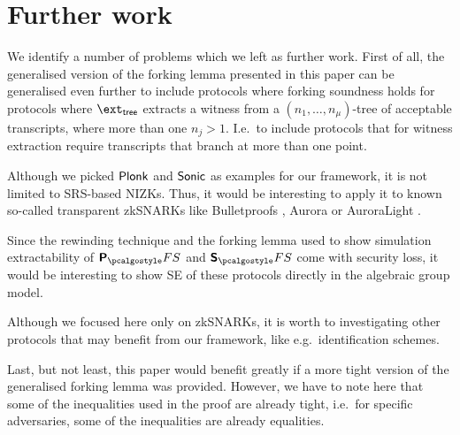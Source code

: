 \documentclass[runningheads,10pt]{llncs}
\begin{document}
\section{Further work}
We identify a number of problems which we left as further work. First of all,
the generalised version of the forking lemma presented in this paper can be
generalised even further to include protocols where forking soundness holds for
protocols where $\extt$ extracts a witness from a $(n_1, \ldots, n_\mu)$-tree of
acceptable transcripts, where more than one $n_j > 1$. I.e.~to include
protocols that for witness extraction require transcripts that branch at more
than one point.

Although we picked $\textnormal{\textsf{Plonk}}$ and ${\textnormal{\textsf{Sonic}}}$ as examples for our framework, it is
not limited to SRS-based NIZKs. Thus, it would be interesting to apply it to
known so-called transparent zkSNARKs like Bulletproofs \cite{SP:BBBPWM18},
Aurora \cite{EC:BCRSVW19} or AuroraLight \cite{EPRINT:Gabizon19a}.

Since the rewinding technique and the forking lemma used to show simulation
extractability of $\plonkprotfs$ and $\sonicprotfs$ come with security loss,
it would be interesting to show SE of these protocols directly in the
algebraic group model.

Although we focused here only on zkSNARKs, it is worth to
investigating other protocols that may benefit from our framework, like
e.g.~identification schemes.

Last, but not least, this paper would benefit greatly if a more tight version
of the generalised forking lemma was provided. However, we have to note here
that some of the inequalities used in the proof are already tight, i.e.~for
specific adversaries, some of the inequalities are already equalities.




\appendix
\end{document}
